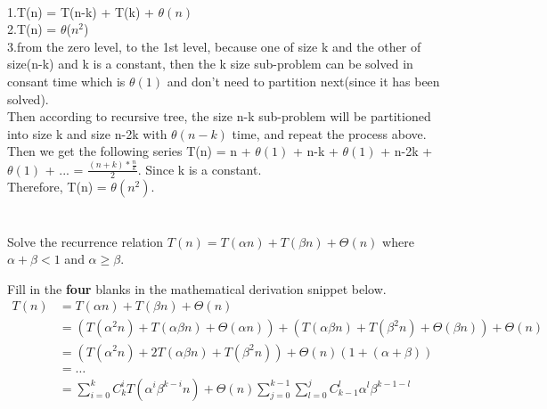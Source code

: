 \begin{parts}
    \begin{solution}\\
    1.T(n) = T(n-k) + T(k) + $\theta(n)$\\
    2.T(n) = $\theta$($n^{2}$)\\
    3.from the zero level, to the 1st level, because one of size k and the other of size(n-k) and k is a constant, then the k size sub-problem can be solved in consant time which is $\theta(1)$ and don't need to partition next(since it has been solved).\\
    Then according to recursive tree, the size n-k sub-problem will be partitioned into size k and size n-2k with $\theta(n-k)$ time, and repeat the process above.\\
    Then we get the following series T(n) = n + $\theta(1)$ + n-k + $\theta(1)$ + n-2k + $\theta(1)$ + ... = $\frac{(n+k)*\frac{n}{k}}{2}$. Since k is a constant.\\
    Therefore, T(n) = $\theta(n^{2})$.
    \end{solution}

    \part{} Solve the recurrence relation $T(n) = T(\alpha n) + T(\beta n) + \Theta(n)$ where $\alpha + \beta < 1$ and $\alpha \geq \beta$.
    \begin{subparts}
        \subpart[2] Fill in the \textbf{four} blanks in the mathematical derivation snippet below.
        \begin{align*}
            T(n) &= T(\alpha n) + T(\beta n) + \Theta(n) \\
                 &= (T(\alpha ^2 n) + T(\alpha \beta n) + \Theta(\alpha n)) +
                    (T(\alpha \beta n) + T(\beta ^2 n) + \Theta(\beta n)) + \Theta(n) \\
                 &= (T(\alpha ^2 n) + 2T(\alpha \beta n) + T(\beta ^2 n)) + \Theta(n) (1 + (\alpha + \beta)) \\
                 &= \dots \\
                 &= \sum _ {i=0} ^k {C_{k}^{i}} T({\alpha^{i} \beta^{k-i} n}) + \Theta(n) \sum _ {j = 0} ^{{k-1}} \sum _ {l = 0} ^{j} {C_{k-1}^{l}\alpha^{l} \beta^{k-1-l}}
        \end{align*}


\end{subparts}
\end{parts}
